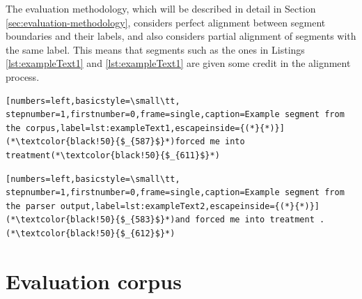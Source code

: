     The evaluation methodology, which will be described in detail in Section \ref{sec:evaluation-methodology}, considers perfect alignment between segment boundaries and their labels, and also considers partial alignment of segments with the same label. This means that segments such as the ones in Listings \ref{lst:exampleText1} and \ref{lst:exampleText1} are given some credit in the alignment process.

\noindent
\begin{minipage}{\linewidth}
\begin{lstlisting}[numbers=left,basicstyle=\small\tt, stepnumber=1,firstnumber=0,frame=single,caption=Example segment from the corpus,label=lst:exampleText1,escapeinside={(*}{*)}]
(*\textcolor{black!50}{$_{587}$}*)forced me into treatment(*\textcolor{black!50}{$_{611}$}*)
\end{lstlisting}
\end{minipage}

\noindent
\begin{minipage}{\linewidth}
\begin{lstlisting}[numbers=left,basicstyle=\small\tt, stepnumber=1,firstnumber=0,frame=single,caption=Example segment from the parser output,label=lst:exampleText2,escapeinside={(*}{*)}]
(*\textcolor{black!50}{$_{583}$}*)and forced me into treatment .(*\textcolor{black!50}{$_{612}$}*)
\end{lstlisting}
\end{minipage}    
     

\section{Evaluation corpus}
\label{sec:corpus}
    
